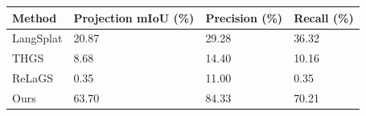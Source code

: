 \begin{tabular}{llll}
\hline
Method & Projection mIoU (\%) & Precision (\%) & Recall (\%) \\
\hline
LangSplat & 20.87 & 29.28 & 36.32 \\
THGS & 8.68 & 14.40 & 10.16 \\
ReLaGS & 0.35 & 11.00 & 0.35 \\
Ours & 63.70 & 84.33 & 70.21 \\
\hline
\end{tabular}
